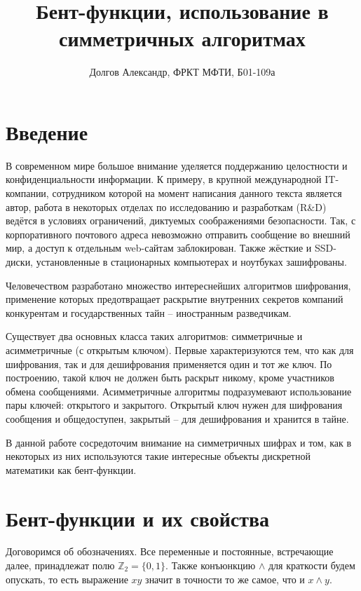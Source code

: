 \documentclass[12pt, a4paper, reqno]{article}
\title{\bf Бент-функции, использование в симметричных алгоритмах}
\date{}
\author{Долгов Александр, ФРКТ МФТИ, Б01-109а}
\begin{document}
\nocite{*}

\maketitle

\newpage
\tableofcontents

\newpage
\section{Введение}

    В современном мире большое внимание уделяется поддержанию целостности и конфиденциальности
    информации. К примеру, в крупной международной IT-компании, сотрудником которой на момент
    написания данного текста является автор, работа в некоторых отделах по исследованию и
    разработкам (R\&D) ведётся в условиях ограничений, диктуемых соображениями безопасности. Так,
    с корпоративного почтового адреса невозможно отправить сообщение во внешний мир, а доступ к
    отдельным web-сайтам заблокирован. Также жёсткие и SSD-диски, установленные в стационарных
    компьютерах и ноутбуках зашифрованы.

    Человечеством разработано множество интереснейших алгоритмов шифрования, применение которых
    предотвращает раскрытие внутренних секретов компаний конкурентам и государственных тайн --
    иностранным разведчикам.

    Существует два основных класса таких алгоритмов: симметричные и асимметричные (с открытым
    ключом). Первые характеризуются тем, что как для шифрования, так и для дешифрования применяется
    один и тот же ключ. По построению, такой ключ не должен быть раскрыт никому, кроме участников
    обмена сообщениями. Асимметричные алгоритмы подразумевают использование пары ключей: открытого и
    закрытого. Открытый ключ нужен для шифрования сообщения и общедоступен, закрытый -- для
    дешифрования и хранится в тайне.

    В данной работе сосредоточим внимание на симметричных шифрах и том, как в некоторых из них
    используются такие интересные объекты дискретной математики как бент-функции.

\section{Бент-функции и их свойства}

    Договоримся об обозначениях. Все переменные и постоянные, встречающие далее, принадлежат полю
    $\mathbb{Z}_2 = \{0, 1\}$. Также конъюнкцию $\wedge$ для краткости будем опускать, то есть
    выражение $xy$ значит в точности то же самое, что и $x \wedge y$.
\end{document}

